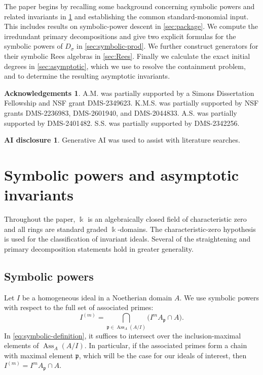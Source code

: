 \documentclass[11pt,reqno]{amsart}
\numberwithin{equation}{subsection}
\theoremstyle{definition}
\newtheorem*{acknowledgement}{Acknowledgements}
\newtheorem*{aidisclosure}{AI disclosure}
\theoremstyle{remark}
\DeclareMathOperator{\Ass}{Ass}
\newcommand{\kfield}{\Bbbk}
\newcommand{\fp}{\mathfrak p}
\begin{document}
The paper begins by recalling some background concerning symbolic powers and related invariants in \cref{sec:asymptotic-background} and establishing the common standard-monomial input. This includes results on symbolic-power descent in \cref{sec:package}. We compute the irredundant primary decompositions and give two explicit formulas for the symbolic powers of $D_\sigma$ in \cref{sec:symbolic-prod}. We further construct generators for their symbolic Rees algebras in \cref{sec:Rees}. Finally we calculate the exact initial degrees in \cref{sec:asymptotic}, which we use to resolve the containment problem, and to determine the resulting asymptotic invariants.

\begin{acknowledgement}
A.M. was partially supported by a Simons Dissertation Fellowship and NSF grant DMS-2349623.
K.M.S. was partially supported by NSF grants DMS-2236983,
DMS-2601940, and DMS-2044833. A.S. was partially supported by DMS-2401482. S.S. was partially supported by DMS-2342256.
\end{acknowledgement}

\begin{aidisclosure}
Generative AI was used to assist with literature searches.    
\end{aidisclosure}

\section{Symbolic powers and asymptotic invariants}\label{sec:asymptotic-background}

Throughout the paper, $\kfield$ is an algebraically closed field of
characteristic zero and all rings are standard graded $\kfield$-domains.
The characteristic-zero hypothesis is used for the classification of
invariant ideals.  Several of the straightening and primary
 decomposition statements hold in greater generality.


\subsection{Symbolic powers}

Let $I$ be a homogeneous ideal in a Noetherian domain $A$.  We use
symbolic powers with respect to the full set of associated primes:
\begin{equation}\label{eq:symbolic-definition}
 I^{(m)}=\bigcap_{\fp\in\Ass_A(A/I)}
 \bigl(I^mA_\fp\cap A\bigr).
\end{equation}
In \eqref{eq:symbolic-definition}, it suffices to intersect over
the inclusion-maximal elements of $\Ass_A(A/I)$.
In particular, if the associated primes form a chain with
maximal element $\fp$, which will be the case for our ideals of interest, then
$I^{(m)}=I^mA_\fp\cap A$.
\end{document}
